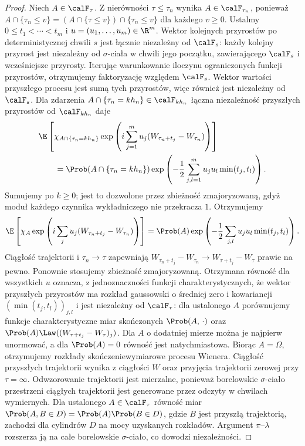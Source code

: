 \begin{proof}
Niech $A\in\calF_\tau$. Z nierówności $\tau\le\tau_n$
wynika $A\in\calF_{\tau_n}$, ponieważ
$A\cap\{\tau_n\le v\}=(A\cap\{\tau\le v\})\cap
\{\tau_n\le v\}$ dla każdego $v\ge0$. Ustalmy
$0\le t_1<\cdots<t_m$ i $u=(u_1,\ldots,u_m)\in\R^m$.
Wektor kolejnych przyrostów po deterministycznej chwili
$s$ jest łącznie niezależny od $\calF_s$: każdy kolejny
przyrost jest niezależny od $\sigma$-ciała w chwili jego
początku, zawierającego $\calF_s$ i wcześniejsze przyrosty.
Iterując warunkowanie iloczynu ograniczonych funkcji
przyrostów, otrzymujemy faktoryzację względem $\calF_s$.
Wektor wartości przyszłego procesu jest sumą tych
przyrostów, więc również jest niezależny od $\calF_s$.
Dla zdarzenia $A\cap\{\tau_n=kh_n\}\in\calF_{kh_n}$
łączna niezależność przyszłych przyrostów od
$\calF_{kh_n}$ daje
\begin{align*}
&\E\left[\chi_{A\cap\{\tau_n=kh_n\}}
\exp\left(i\sum_{j=1}^m u_j(W_{\tau_n+t_j}-W_{\tau_n})\right)\right]\\
&\qquad=\Prob(A\cap\{\tau_n=kh_n\})
\exp\left(-\frac12\sum_{j,l=1}^m u_ju_l\min(t_j,t_l)\right).
\end{align*}
Sumujemy po $k\ge0$; jest to dozwolone przez
zbieżność zmajoryzowaną, gdyż moduł każdego czynnika
wykładniczego nie przekracza $1$. Otrzymujemy
\[
\E\left[\chi_A\exp\left(i\sum_j u_j
(W_{\tau_n+t_j}-W_{\tau_n})\right)\right]
=\Prob(A)\exp\left(-\frac12\sum_{j,l}
 u_ju_l\min(t_j,t_l)\right).
\]
Ciągłość trajektorii i $\tau_n\to\tau$ zapewniają
$W_{\tau_n+t_j}-W_{\tau_n}\to W_{\tau+t_j}-W_\tau$
prawie na pewno. Ponownie stosujemy zbieżność zmajoryzowaną.
Otrzymana równość dla wszystkich $u$ oznacza, z jednoznaczności
funkcji charakterystycznych, że wektor przyszłych przyrostów
ma rozkład gaussowski o średniej zero i kowariancji
$(\min(t_j,t_l))_{j,l}$ i jest niezależny od $\calF_\tau$:
dla ustalonego $A$ porównujemy funkcje charakterystyczne
miar skończonych $\Prob(A,\,\cdot)$ oraz
$\Prob(A)\Law((W_{\tau+t_j}-W_\tau)_j)$.
Dla $A$ o dodatniej mierze można je najpierw unormować,
a dla $\Prob(A)=0$ równość jest natychmiastowa.
Biorąc $A=\Omega$, otrzymujemy rozkłady
skończeniewymiarowe procesu Wienera. Ciągłość
przyszłych trajektorii wynika z ciągłości $W$ oraz
przyjęcia trajektorii zerowej przy $\tau=\infty$.
Odwzorowanie trajektorii jest mierzalne, ponieważ
borelowskie $\sigma$-ciało przestrzeni ciągłych trajektorii
jest generowane przez odczyty w chwilach wymiernych.
Dla ustalonego $A\in\calF_\tau$ równość miar
$\Prob(A,B\in D)=\Prob(A)\Prob(B\in D)$,
gdzie $B$ jest przyszłą trajektorią, zachodzi dla
cylindrów $D$ na mocy uzyskanych rozkładów.
Argument $\pi$--$\lambda$ rozszerza ją na całe
borelowskie $\sigma$-ciało, co dowodzi niezależności.
\end{proof}

